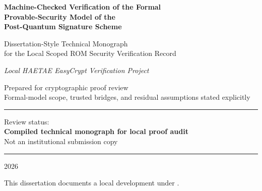 
\newpage
\thispagestyle{empty}

\null\vspace{2cm}

{\centering\LARGE\bfseries
Machine-Checked Verification of the Formal\\[0.5em]
Provable-Security Model of the \haetae{}\\[0.5em]
Post-Quantum Signature Scheme\par}

\vspace{1.5cm}

{\centering\large
Dissertation-Style Technical Monograph\\
for the Local Scoped ROM Security Verification Record\par}

\vspace{1.5cm}

{\centering\Large\itshape Local HAETAE EasyCrypt Verification Project\par}

\vspace{0.5cm}

{\centering\large
Prepared for cryptographic proof review\\
Formal-model scope, trusted bridges, and residual assumptions stated explicitly\par}

\vspace{1.5cm}

\begin{center}\rule{0.6\textwidth}{0.5pt}\end{center}

\vspace{0.5cm}

{\centering\large
Review status:\\[0.3em]
\textbf{Compiled technical monograph for local proof audit}\\
Not an institutional submission copy\par}

\vspace{1.5cm}

\begin{center}\rule{0.6\textwidth}{0.5pt}\end{center}

\vspace{0.5cm}

{\centering\large 2026\par}

\vfill

{\centering\small
This dissertation documents a local \easycrypt{} development under
.\par}

\cleardoublepage
